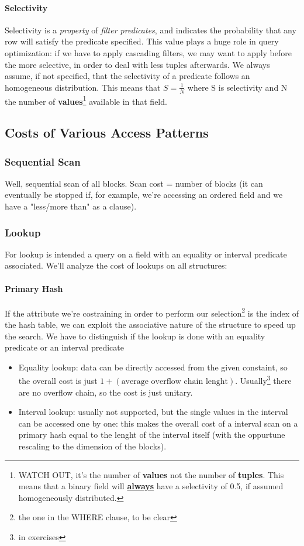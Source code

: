 \documentclass{article}
\begin{document}
		\paragraph{Selectivity}
			Selectivity is a \textit{property} of \textit{filter predicates}, and indicates the probability that any row will satisfy the predicate specified. This value plays a huge role in query optimization: if we have to apply cascading filters, we may want to apply before the more selective, in order to deal with less tuples afterwards. We always assume, if not specified, that the selectivity of a predicate follows an homogeneous distribution. This means that $ S = \frac{1}{N} $ where S is selectivity and N the number of \textbf{values}\footnote{WATCH OUT, it's the number of \textbf{values} not the number of \textbf{tuples}. This means that a binary field will \textbf{\underline{always}} have a selectivity of 0.5, if assumed homogeneously distributed.} available in that field.

		\subsection{Costs of Various Access Patterns}
			\subsubsection{Sequential Scan}
				Well, sequential scan of all blocks. Scan cost = number of blocks (it can eventually be stopped if, for example, we're accessing an ordered field and we have a "less/more than" as a clause).

			\subsubsection{Lookup}
				For lookup is intended a query on a field with an equality or interval predicate associated. We'll analyze the cost of lookups on all structures:

				\paragraph{Primary Hash}
					If the attribute we're costraining in order to perform our selection\footnote{the one in the WHERE clause, to be clear} is the index of the hash table, we can exploit the associative nature of the structure to speed up the search. We have to distinguish if the lookup is done with an equality predicate or an interval predicate
					\begin{itemize} 
						\item Equality lookup: data can be directly accessed from the given constaint, so the overall cost is just $1 + (\text{average overflow chain lenght})$. Usually\footnote{in exercises} there are no overflow chain, so the cost is just unitary.
						\item Interval lookup: usually not supported, but the single values in the interval can be accessed one by one: this makes the overall cost of a interval scan on a primary hash equal to the lenght of the interval itself (with the oppurtune rescaling to the dimension of the blocks).
					\end{itemize}
\end{document}
